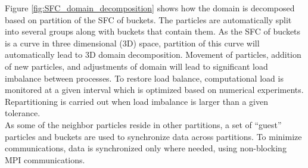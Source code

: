 Figure \ref{fig:SFC_domain_decomposition} shows how the domain is decomposed based on partition of the SFC of buckets. The particles are automatically split into several groups along with buckets that contain them. As the SFC of buckets is a curve in three dimensional (3D) space, partition of this curve will automatically lead to 3D domain decomposition. 
Movement of particles, addition of new particles, and adjustments of domain will lead to significant load imbalance between processes. To restore load balance, computational load is monitored at a given interval which is optimized based on numerical experiments. Repartitioning is carried out when load imbalance is larger than a given tolerance.
\\
As some of the neighbor particles reside in other partitions, a set of ``guest'' particles and buckets are used to synchronize data across partitions. To minimize communications, data is synchronized only where needed, using non-blocking MPI communications. 
